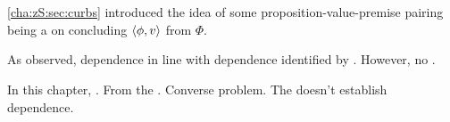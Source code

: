 \chapter{}
\label{cha:zS:sec:requs}

\begin{note}
  \autoref{cha:zS:sec:curbs} introduced the idea of some proposition-value-premise pairing being a \curb{} on concluding \(\langle \phi, v \rangle\) from \(\Phi\).

  As observed, dependence in line with dependence identified by \qWhyV{}.
  However, no \ros{}.

  In this chapter, \requ{}.
  From the \agpe{}.
  Converse problem.
  The \agpe{} doesn't establish dependence.
\end{note}

\section{}
\label{sec:requ3}

